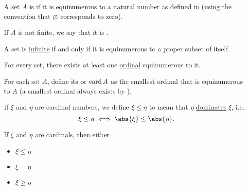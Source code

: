 \begin{definition}\label{def:finite_set}\mcite\cite[133]{Enderton1977Sets}
  A set \( A \) is  if it is equinumerous to a natural number as defined in  (using the convention that \( \varnothing \) corresponds to zero).

  If \( A \) is not finite, we say that it is .
\end{definition}

\begin{proposition}\label{thm:infinite_set_iff_equinumerous_to_proper_subset}\mcite\cite[cor. 6D]{Enderton1977Sets}
  A set is \hyperref[def:finite_set]{infinite} if and only if it is equinumerous to a proper subset of itself.
\end{proposition}

\begin{theorem}\label{thm:equinumerous_ordinal_existence}\mcite\cite[197]{Enderton1977Sets}
  For every set, there exists at least one \hyperref[def:ordinal]{ordinal} equinumerous to it.
\end{theorem}

\medskip

\begin{definition}\label{def:cardinal}\mcite\cite[197]{Enderton1977Sets}
  For each set \( A \), define its  or  \( \operatorname{card} A \) as the smallest ordinal that is equinumerous to \( A \) (a smallest ordinal always exists by ).

  If \( \xi \) and \( \eta \) are cardinal numbers, we define \( \xi \leq \eta \) to mean that \( \eta \) \hyperref[def:set_domination]{dominates} \( \xi \), i.e.
  \begin{equation*}
    \xi \leq \eta \iff \abs{\xi} \leq \abs{\eta}.
  \end{equation*}
\end{definition}

\begin{theorem}\label{thm:cardinal_trichotomy}\mcite\cite[thm. 6M(5)]{Enderton1977Sets}
  If \( \xi \) and \( \eta \) are cardinals, then either
  \begin{itemize}
    \item \( \xi \leq \eta \)
    \item \( \xi = \eta \)
    \item \( \xi \geq \eta \)
  \end{itemize}
\end{theorem}


